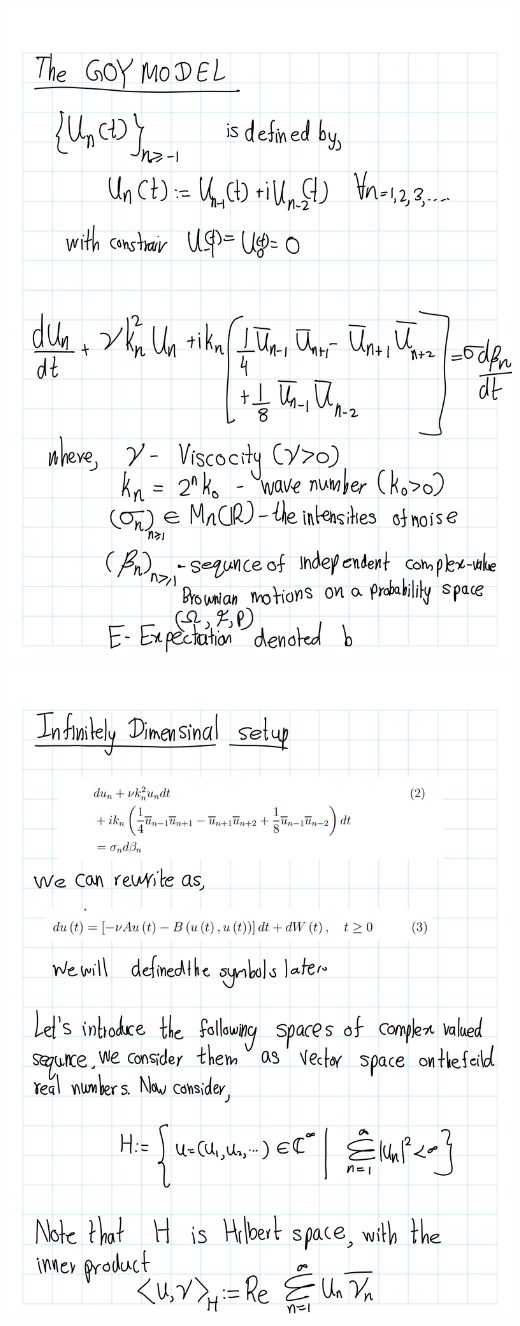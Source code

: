 \documentclass[
]{book}
\theoremstyle{definition}
\theoremstyle{definition}
\theoremstyle{definition}
\theoremstyle{definition}
\theoremstyle{remark}
\begin{document}
\includegraphics[width=18cm,height=\textheight]{fig/Book/fig book-1.png}
\includegraphics[width=18cm,height=\textheight]{fig/Book/fig book-2.png}
\end{document}
